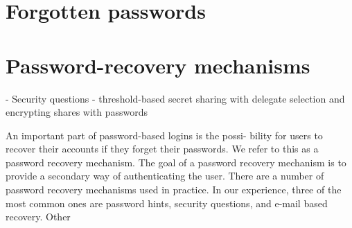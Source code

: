 \section{Forgotten passwords}

\section{Password-recovery mechanisms}
  - Security questions
  - threshold-based secret sharing with delegate selection and encrypting
  shares with passwords



An important part of password-based logins is the possi-
 bility for users to recover their accounts if they forget their
 passwords. We refer to this as a password recovery mechanism.
 The goal of a password recovery mechanism is to provide a
 secondary way of authenticating the user. There are a number
 of password recovery mechanisms used in practice. In our
 experience, three of the most common ones are password
 hints, security questions, and e-mail based recovery. Other

